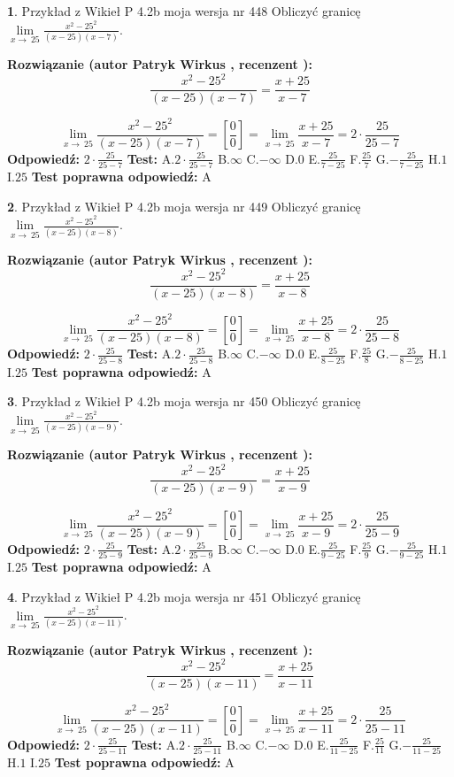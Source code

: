 \documentclass[12pt, a4paper]{article}
\theoremstyle{definition} %
\newtheorem{zad}{}
\newcommand{\zadStart}[1]{\begin{zad}#1\newline}
\newcommand{\zadStop}{\end{zad}}
\newcommand{\rozwStart}[2]{\noindent \textbf{Rozwiązanie (autor #1 , recenzent #2): }\newline}
\newcommand{\rozwStop}{\newline}
\newcommand{\odpStart}{\noindent \textbf{Odpowiedź:}\newline}
\newcommand{\odpStop}{\newline}
\newcommand{\testStart}{\noindent \textbf{Test:}\newline}
\newcommand{\testStop}{\newline}
\newcommand{\kluczStart}{\noindent \textbf{Test poprawna odpowiedź:}\newline}
\newcommand{\kluczStop}{\newline}
\begin{document}
\zadStart{Przykład z Wikieł P 4.2b moja wersja nr 448}
Obliczyć granicę $\lim\limits_{x\to\ 25}\frac{x^{2}-25^{2}}{(x-25)(x-7)}$.
\zadStop
\rozwStart{Patryk Wirkus}{}
$$\frac{x^{2}-25^{2}}{(x-25)(x-7)}=\frac{x+25}{x-7}$$

$$\lim\limits_{x\to\ 25}\frac{x^{2}-25^{2}}{(x-25)(x-7)}=[\frac{0}{0}]=\lim\limits_{x\to\ 25}\frac{x+25}{x-7}=2 \cdot \frac{25}{25-7}$$
\rozwStop
\odpStart
$2 \cdot \frac{25}{25-7}$
\odpStop
\testStart
A.$2 \cdot \frac{25}{25-7}$
B.$\infty$
C.$-\infty$
D.$0$
E.$\frac{25}{7-25}$
F.$\frac{25}{7}$
G.$-\frac{25}{7-25}$
H.$1$
I.$25$
\testStop
\kluczStart
A
\kluczStop



\zadStart{Przykład z Wikieł P 4.2b moja wersja nr 449}
Obliczyć granicę $\lim\limits_{x\to\ 25}\frac{x^{2}-25^{2}}{(x-25)(x-8)}$.
\zadStop
\rozwStart{Patryk Wirkus}{}
$$\frac{x^{2}-25^{2}}{(x-25)(x-8)}=\frac{x+25}{x-8}$$

$$\lim\limits_{x\to\ 25}\frac{x^{2}-25^{2}}{(x-25)(x-8)}=[\frac{0}{0}]=\lim\limits_{x\to\ 25}\frac{x+25}{x-8}=2 \cdot \frac{25}{25-8}$$
\rozwStop
\odpStart
$2 \cdot \frac{25}{25-8}$
\odpStop
\testStart
A.$2 \cdot \frac{25}{25-8}$
B.$\infty$
C.$-\infty$
D.$0$
E.$\frac{25}{8-25}$
F.$\frac{25}{8}$
G.$-\frac{25}{8-25}$
H.$1$
I.$25$
\testStop
\kluczStart
A
\kluczStop



\zadStart{Przykład z Wikieł P 4.2b moja wersja nr 450}
Obliczyć granicę $\lim\limits_{x\to\ 25}\frac{x^{2}-25^{2}}{(x-25)(x-9)}$.
\zadStop
\rozwStart{Patryk Wirkus}{}
$$\frac{x^{2}-25^{2}}{(x-25)(x-9)}=\frac{x+25}{x-9}$$

$$\lim\limits_{x\to\ 25}\frac{x^{2}-25^{2}}{(x-25)(x-9)}=[\frac{0}{0}]=\lim\limits_{x\to\ 25}\frac{x+25}{x-9}=2 \cdot \frac{25}{25-9}$$
\rozwStop
\odpStart
$2 \cdot \frac{25}{25-9}$
\odpStop
\testStart
A.$2 \cdot \frac{25}{25-9}$
B.$\infty$
C.$-\infty$
D.$0$
E.$\frac{25}{9-25}$
F.$\frac{25}{9}$
G.$-\frac{25}{9-25}$
H.$1$
I.$25$
\testStop
\kluczStart
A
\kluczStop



\zadStart{Przykład z Wikieł P 4.2b moja wersja nr 451}
Obliczyć granicę $\lim\limits_{x\to\ 25}\frac{x^{2}-25^{2}}{(x-25)(x-11)}$.
\zadStop
\rozwStart{Patryk Wirkus}{}
$$\frac{x^{2}-25^{2}}{(x-25)(x-11)}=\frac{x+25}{x-11}$$

$$\lim\limits_{x\to\ 25}\frac{x^{2}-25^{2}}{(x-25)(x-11)}=[\frac{0}{0}]=\lim\limits_{x\to\ 25}\frac{x+25}{x-11}=2 \cdot \frac{25}{25-11}$$
\rozwStop
\odpStart
$2 \cdot \frac{25}{25-11}$
\odpStop
\testStart
A.$2 \cdot \frac{25}{25-11}$
B.$\infty$
C.$-\infty$
D.$0$
E.$\frac{25}{11-25}$
F.$\frac{25}{11}$
G.$-\frac{25}{11-25}$
H.$1$
I.$25$
\testStop
\kluczStart
A
\kluczStop
\end{document}
